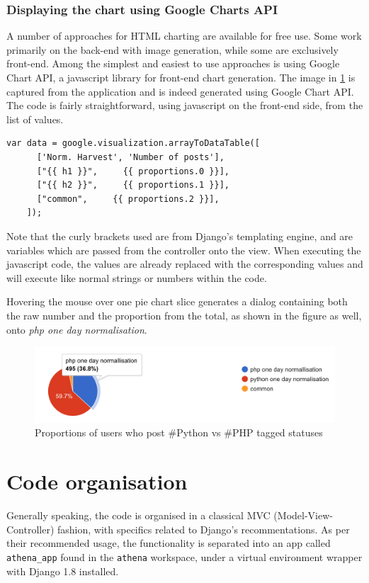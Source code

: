 \subsubsection{Displaying the chart using Google Charts API}
A number of approaches for HTML charting are available for free use. Some work primarily on the back-end with image generation, while some are exclusively front-end. Among the simplest and easiest to use approaches is using Google Chart API, a javascript library for front-end chart generation. The image in \ref{fig:piechart} is captured from the application and is indeed generated using Google Chart API. The code is fairly straightforward, using javascript on the front-end side, from the list of values.

\begin{lstlisting}
var data = google.visualization.arrayToDataTable([
      ['Norm. Harvest', 'Number of posts'],
      ["{{ h1 }}",     {{ proportions.0 }}],
      ["{{ h2 }}",     {{ proportions.1 }}],
      ["common",     {{ proportions.2 }}],
    ]);
\end{lstlisting}

Note that the curly brackets used are from Django's templating engine, and are variables which are passed from the controller onto the view. When executing the javascript code, the values are already replaced with the corresponding values and will execute like normal strings or numbers within the code.

Hovering the mouse over one pie chart slice generates a dialog containing both the raw number and the proportion from the total, as shown in the figure as well, onto \emph{php one day normalisation}.

\begin{figure}
    \centering
\includegraphics[width=\columnwidth]{img/piechart.png}
    \caption{Proportions of users who post \#Python vs \#PHP tagged statuses}
    \label{fig:piechart}
\end{figure}

\section{Code organisation}
Generally speaking, the code is organised in a classical MVC (Model-View-Controller) fashion, with specifics related to Django's recommentations. As per their recommended usage, the functionality is separated into an app called \texttt{athena\_app} found in the \texttt{athena} workspace, under a virtual environment wrapper with Django 1.8 installed. 

